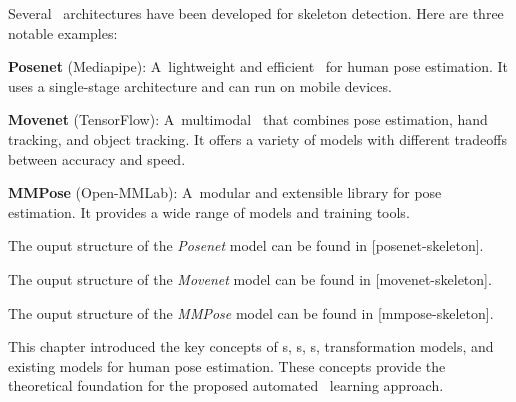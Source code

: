Several \NN\ architectures have been developed for skeleton detection. Here are three notable examples:

\startitemize[n]
    \item {\bf Posenet} (Mediapipe): A~lightweight and efficient \NN\ for human pose estimation. It uses a single-stage architecture and can run on mobile devices.
    \item {\bf Movenet} (TensorFlow): A~multimodal \NN\ that combines pose estimation, hand tracking, and object tracking. It offers a variety of models with different tradeoffs between accuracy and speed.
    \item {\bf MMPose} (Open-MMLab): A~modular and extensible library for pose estimation. It provides a wide range of models and training tools.
\stopitemize

The ouput structure of the {\em Posenet} model can be found in [posenet-skeleton].

The ouput structure of the {\em Movenet} model can be found in [movenet-skeleton].

The ouput structure of the {\em MMPose} model can be found in [mmpose-skeleton].

This chapter introduced the key concepts of \NN\-s, \CNN\-s, \RCNN\-s, transformation models, and existing models for human pose estimation. These concepts provide the theoretical foundation for the proposed automated \NN\ learning approach.

